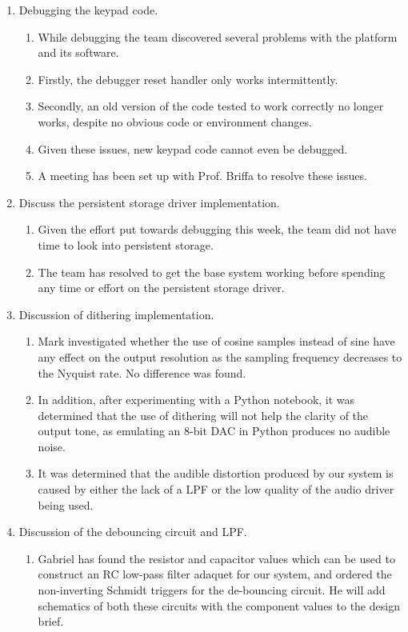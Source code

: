 \documentclass[11pt,a4paper]{scrartcl}
\begin{document}
\begin{enumerate}
    \item Debugging the keypad code.
        \begin{enumerate}
            \item While debugging the team discovered several problems with the platform and its software.
            \item Firstly, the debugger reset handler only works intermittently.
            \item Secondly, an old version of the code tested to work correctly no longer works, despite no obvious code or environment changes.
            \item Given these issues, new keypad code cannot even be debugged.
            \item A meeting has been set up with Prof. Briffa to resolve these issues.
        \end{enumerate}

    \item Discuss the persistent storage driver implementation.
        \begin{enumerate}
            \item Given the effort put towards debugging this week, the team did not have time to look into persistent storage.
            \item The team has resolved to get the base system working before spending any time or effort on the persistent storage driver.
        \end{enumerate}

    \item Discussion of dithering implementation.
        \begin{enumerate}
            \item Mark investigated whether the use of cosine samples instead of sine have any effect on the output resolution as the sampling frequency decreases to the Nyquist rate. No difference was found.
            \item In addition, after experimenting with a Python notebook, it was determined that the use of dithering will not help the clarity of the output tone, as emulating an 8-bit DAC in Python produces no audible noise.
            \item It was determined that the audible distortion produced by our system is caused by either the lack of a LPF or the low quality of the audio driver being used.
        \end{enumerate}

    \item Discussion of the debouncing circuit and LPF.
        \begin{enumerate}
            \item Gabriel has found the resistor and capacitor values which can be used to construct an RC low-pass filter adaquet for our system, and ordered the non-inverting Schmidt triggers for the de-bouncing circuit.
                He will add schematics of both these circuits with the component values to the design brief.
        \end{enumerate}


\end{enumerate}
\end{document}
